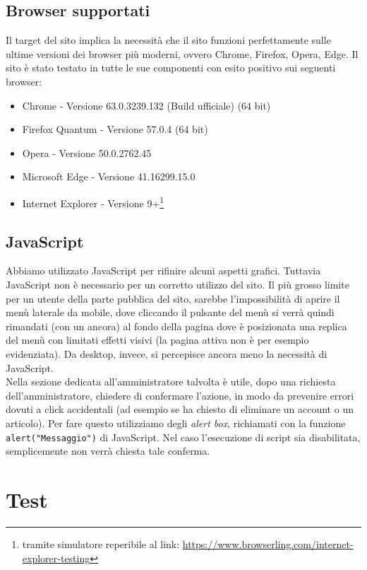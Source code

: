 \documentclass[12pt]{article}
\newcommand{\code}[1]{\texttt{#1}}
\begin{document}
	\subsection{Browser supportati}
	
	Il target del sito implica la necessità che il sito funzioni perfettamente sulle ultime versioni dei browser più moderni, ovvero Chrome, Firefox, Opera, Edge. Il sito è stato testato in tutte le sue componenti con esito positivo sui seguenti browser:
	
	\begin{itemize}
		\item Chrome - Versione 63.0.3239.132 (Build ufficiale) (64 bit)
		\item Firefox Quantum - Versione 57.0.4 (64 bit)
		\item Opera - Versione 50.0.2762.45 
		\item Microsoft Edge - Versione 41.16299.15.0
		\item Internet Explorer - Versione 9+\footnote{tramite simulatore reperibile al link: \url{https://www.browserling.com/internet-explorer-testing}}
	\end{itemize} 

	\subsection{JavaScript}
	Abbiamo utilizzato JavaScript per rifinire alcuni aspetti grafici. Tuttavia JavaScript non è necessario per un corretto utilizzo del sito. Il più grosso limite per un utente della parte pubblica del sito, sarebbe l'impossibilità di aprire il menù laterale da mobile, dove cliccando il pulsante del menù si verrà quindi rimandati (con un ancora) al fondo della pagina dove è posizionata una replica del menù con limitati effetti visivi (la pagina attiva non è per esempio evidenziata). Da desktop, invece, si percepisce ancora meno la necessità di JavaScript.\\ 
	Nella sezione dedicata all'amministratore talvolta è utile, dopo una richiesta dell'amministratore, chiedere di confermare l'azione, in modo da prevenire errori dovuti a click accidentali (ad esempio se ha chiesto di eliminare un account o un articolo). Per fare questo utilizziamo degli \textit{alert box}, richiamati con la funzione \code{alert("Messaggio")} di JavaScript. Nel caso l'esecuzione di script sia disabilitata, semplicemente non verrà chiesta tale conferma.
	
	
	
	\section{Test}
	
\end{document}
